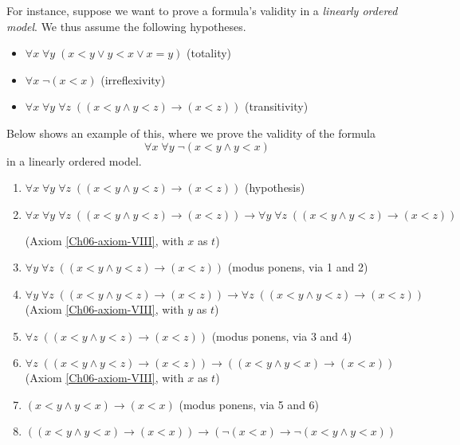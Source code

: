 For instance, suppose we want to prove a formula's validity in a \emph{linearly ordered model}. We thus assume the following hypotheses.
%
\begin{itemize}
    \item \(\forall x\; \forall y\; (x < y \lor y < x \lor x = y)\)
    \hfill (totality)
    \item \(\forall x\; \neg(x < x)\)
    \hfill (irreflexivity)
    \item \(\forall x\; \forall y\; \forall z\; ((x < y \land y < z) \rightarrow (x < z))\)
    \hfill (transitivity)
\end{itemize}
%
Below shows an example of this, where we prove the validity of the formula
%
\[\forall x\; \forall y\; \neg(x < y \land y < x)\]
%
in a linearly ordered model.
%
\begin{enumerate}
    \item \(\forall x\; \forall y\; \forall z\; ((x < y \land y < z) \rightarrow (x < z))\)
    \hfill (hypothesis)

    \item \(\forall x\; \forall y\; \forall z\; ((x < y \land y < z) \rightarrow (x < z)) \rightarrow \forall y\; \forall z\; ((x < y \land y < z) \rightarrow (x < z))\)
    
    \hfill (Axiom \ref{Ch06-axiom-VIII}, with \(x\) as \(t\))

    \item \(\forall y\; \forall z\; ((x < y \land y < z) \rightarrow (x < z))\)
    \hfill (modus ponens, via 1 and 2)

    \item \(\forall y\; \forall z\; ((x < y \land y < z) \rightarrow (x < z)) \rightarrow \forall z\; ((x < y \land y < z) \rightarrow (x < z))\)
    \hfill (Axiom \ref{Ch06-axiom-VIII}, with \(y\) as \(t\))

    \item \(\forall z\; ((x < y \land y < z) \rightarrow (x < z))\)
    \hfill (modus ponens, via 3 and 4)

    \item \(\forall z\; ((x < y \land y < z) \rightarrow (x < z)) \rightarrow ((x < y \land y < x) \rightarrow (x < x))\)
    \hfill (Axiom \ref{Ch06-axiom-VIII}, with \(x\) as \(t\))

    \item \((x < y \land y < x) \rightarrow (x < x)\)
    \hfill (modus ponens, via 5 and 6)

    \item \(((x < y \land y < x) \rightarrow (x < x)) \rightarrow (\neg(x < x) \rightarrow \neg(x < y \land y < x))\)
    

\end{enumerate}
